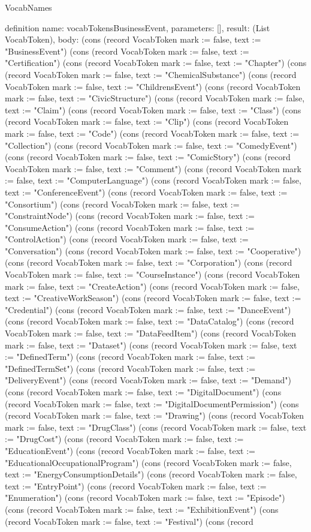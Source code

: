 \begin{lexlean}{VocabNames}
\begin{semanticmodule}
definition{
  name: vocabTokensBusinessEvent,
  parameters: [],
  result: (List VocabToken),
  body: (cons (record VocabToken {mark := false, text := "BusinessEvent"}) (cons (record VocabToken {mark := false, text := "Certification"}) (cons (record VocabToken {mark := false, text := "Chapter"}) (cons (record VocabToken {mark := false, text := "ChemicalSubstance"}) (cons (record VocabToken {mark := false, text := "ChildrensEvent"}) (cons (record VocabToken {mark := false, text := "CivicStructure"}) (cons (record VocabToken {mark := false, text := "Claim"}) (cons (record VocabToken {mark := false, text := "Class"}) (cons (record VocabToken {mark := false, text := "Clip"}) (cons (record VocabToken {mark := false, text := "Code"}) (cons (record VocabToken {mark := false, text := "Collection"}) (cons (record VocabToken {mark := false, text := "ComedyEvent"}) (cons (record VocabToken {mark := false, text := "ComicStory"}) (cons (record VocabToken {mark := false, text := "Comment"}) (cons (record VocabToken {mark := false, text := "ComputerLanguage"}) (cons (record VocabToken {mark := false, text := "ConferenceEvent"}) (cons (record VocabToken {mark := false, text := "Consortium"}) (cons (record VocabToken {mark := false, text := "ConstraintNode"}) (cons (record VocabToken {mark := false, text := "ConsumeAction"}) (cons (record VocabToken {mark := false, text := "ControlAction"}) (cons (record VocabToken {mark := false, text := "Conversation"}) (cons (record VocabToken {mark := false, text := "Cooperative"}) (cons (record VocabToken {mark := false, text := "Corporation"}) (cons (record VocabToken {mark := false, text := "CourseInstance"}) (cons (record VocabToken {mark := false, text := "CreateAction"}) (cons (record VocabToken {mark := false, text := "CreativeWorkSeason"}) (cons (record VocabToken {mark := false, text := "Credential"}) (cons (record VocabToken {mark := false, text := "DanceEvent"}) (cons (record VocabToken {mark := false, text := "DataCatalog"}) (cons (record VocabToken {mark := false, text := "DataFeedItem"}) (cons (record VocabToken {mark := false, text := "Dataset"}) (cons (record VocabToken {mark := false, text := "DefinedTerm"}) (cons (record VocabToken {mark := false, text := "DefinedTermSet"}) (cons (record VocabToken {mark := false, text := "DeliveryEvent"}) (cons (record VocabToken {mark := false, text := "Demand"}) (cons (record VocabToken {mark := false, text := "DigitalDocument"}) (cons (record VocabToken {mark := false, text := "DigitalDocumentPermission"}) (cons (record VocabToken {mark := false, text := "Drawing"}) (cons (record VocabToken {mark := false, text := "DrugClass"}) (cons (record VocabToken {mark := false, text := "DrugCost"}) (cons (record VocabToken {mark := false, text := "EducationEvent"}) (cons (record VocabToken {mark := false, text := "EducationalOccupationalProgram"}) (cons (record VocabToken {mark := false, text := "EnergyConsumptionDetails"}) (cons (record VocabToken {mark := false, text := "EntryPoint"}) (cons (record VocabToken {mark := false, text := "Enumeration"}) (cons (record VocabToken {mark := false, text := "Episode"}) (cons (record VocabToken {mark := false, text := "ExhibitionEvent"}) (cons (record VocabToken {mark := false, text := "Festival"}) (cons (record }
\end{semanticmodule}
\end{lexlean}
